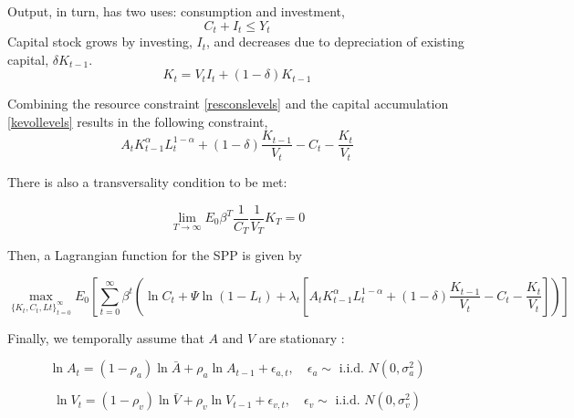 \documentclass[11pt]{article}
\begin{document}
Output, in turn, has two uses: consumption and investment,
\begin{equation}\label{resconslevels}
C_t + I_t \leq Y_{t}
\end{equation}
Capital stock grows by investing, $I_t$, and decreases due to depreciation of existing capital, $\delta K_{t-1}$.
\begin{equation}\label{kevollevels}
K_{t} = V_{t} I_t + (1-\delta) K_{t-1}
\end{equation}

Combining the resource constraint \ref{resconslevels} and the capital accumulation \ref{kevollevels} results in the following constraint,
\[ A_t  K^{\alpha}_{t-1} L^{1-\alpha}_{t}  + (1-\delta) \frac{K_{t-1}}{V_t}  -C_t - \frac{K_{t}}{V_t} \]

There is also a transversality condition to be met:

\[ \lim_{T \rightarrow \infty } E_0 \beta^{T} \frac{1}{C_T} \frac{1}{V_T} K_T = 0\]


Then, a  Lagrangian function for the SPP is given by 


\begin{equation}\label{eq:LagrangianSP}
\max_{\{ K_t,C_t,Lt\}_{t=0}^{\infty}}   E_0  \left[ \sum_{t=0}^{\infty} \beta^t \left( \ln C_t + \Psi \ln (1-L_t) +\lambda_t \left[ A_t  K^{\alpha}_{t-1} L^{1-\alpha}_{t}  + (1-\delta) \frac{K_{t-1}}{V_t}  -C_t - \frac{K_{t}}{V_t}  \right]\right)  \right]  
\end{equation}

Finally, we temporally assume that $A$ and $V$ are stationary :

\begin{equation}\label{eq:evo_A}
\ln A_t = (1-\rho_a) \ln \bar{A} + \rho_a \ln A_{t-1} + \epsilon_{a,t}, \quad \epsilon_a \sim \text{ i.i.d. } N(0,\sigma_a^2)  
\end{equation} 

\begin{equation}\label{eq:evo_V}
\ln V_t = (1-\rho_v)\ln \bar{V} + \rho_v \ln V_{t-1} + \epsilon_{v,t}, \quad \epsilon_v \sim \text{ i.i.d. } N(0,\sigma_v^2)  
\end{equation} 
\end{document}
